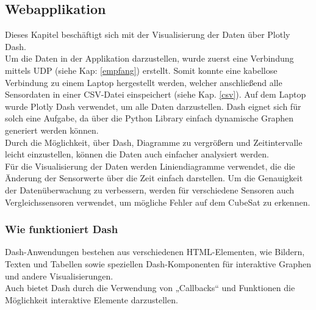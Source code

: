 
\subsection{Webapplikation}\label{Web}
Dieses Kapitel beschäftigt sich mit der Visualisierung der Daten über Plotly Dash. \\
\vspace{3mm}
Um die Daten in der Applikation darzustellen, wurde zuerst eine Verbindung mittels UDP (siehe Kap: \ref{empfang}) erstellt. Somit konnte eine kabellose Verbindung zu einem Laptop hergestellt werden, welcher anschließend alle Sensordaten in einer CSV-Datei einspeichert (siehe Kap. \ref{csv}). Auf dem Laptop wurde Plotly Dash verwendet, um alle Daten darzustellen. Dash eignet sich für solch eine Aufgabe, da über die Python Library einfach dynamische Graphen generiert werden können. \\
\vspace{3mm}
Durch die Möglichkeit, über Dash, Diagramme zu vergrößern und Zeitintervalle leicht einzustellen, können die Daten auch einfacher analysiert werden. \\
\vspace{3mm}
Für die Visualisierung der Daten werden Liniendiagramme verwendet, die die Änderung der Sensorwerte über die Zeit einfach darstellen. Um die Genauigkeit der Datenüberwachung zu verbessern, werden für verschiedene Sensoren auch Vergleichssensoren verwendet, um mögliche Fehler auf dem CubeSat zu erkennen.\\
\vspace{3mm}
\subsubsection{Wie funktioniert Dash }
Dash-Anwendungen\autocite{Dash} bestehen aus verschiedenen HTML-Elementen, wie Bildern, Texten und Tabellen sowie speziellen Dash-Komponenten für interaktive Graphen und andere Visualisierungen. \\
\vspace{3mm}
Auch bietet Dash durch die Verwendung von „Callbacks“ und Funktionen die Möglichkeit interaktive Elemente darzustellen. 

